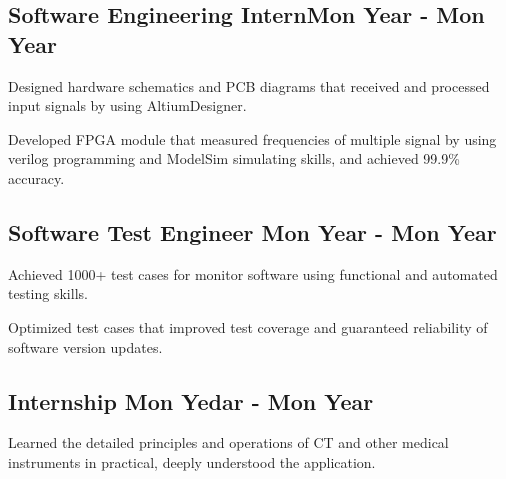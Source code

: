 \documentclass[a4paper,12pt]{article}
\begin{document}


\vspace*{10pt}
\subsection{{Software Engineering Intern}\hfill Mon Year - Mon Year}
\begin{zitemize}
\item Designed hardware schematics and PCB diagrams that received and processed input signals by using AltiumDesigner. 
\item Developed FPGA module that measured frequencies of multiple signal by using verilog programming and ModelSim simulating skills, and achieved 99.9\% accuracy.
\end{zitemize}

\vspace*{6pt}
\subsection{{Software Test Engineer }\hfill Mon Year - Mon Year}
\begin{zitemize}
\item Achieved 1000+ test cases for monitor software using functional and automated testing skills. 
\item Optimized test cases that improved test coverage and guaranteed reliability of software version updates. 
\end{zitemize}

\vspace*{6pt}
\subsection{{Internship }\hfill Mon Yedar - Mon Year}
\begin{zitemize}
\item Learned the detailed principles and operations of CT and other medical instruments in practical, deeply understood the application.
\end{zitemize}
\end{document}
